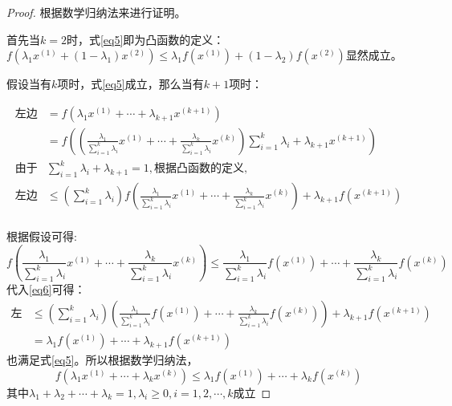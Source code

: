 \documentclass[a4paper]{article}
\begin{document}
\begin{proof}
	根据数学归纳法来进行证明。
	
	首先当$k=2$时，式\ref{eq5}即为凸函数的定义：$f(\lambda_1x^{(1)}+(1-\lambda_1)x^{(2)})\le \lambda_1f(x^{(1)})+(1-\lambda_2)f(x^{(2)})$显然成立。
	
	假设当有$k$项时，式\ref{eq5}成立，那么当有$k+1$项时：
	
	\begin{equation}
	\label{eq6}
	\begin{aligned}
	\mbox{左边} &= f(\lambda_1x^{(1)}+\cdots+\lambda_{k+1}x^{(k+1)}) \\
	&= f((\frac{\lambda_1}{\sum_{i=1}^k\lambda_i}x^{(1)}+\cdots+\frac{\lambda_k}{\sum_{i=1}^k\lambda_i}x^{(k)})\sum_{i=1}^k\lambda_i+\lambda_{k+1}x^{(k+1)}) \\
	\mbox{由于}&\sum_{i=1}^k\lambda_i+\lambda_{k+1}=1,\mbox{根据凸函数的定义},\\
	\mbox{左边}&\le(\sum_{i=1}^k\lambda_i)f(\frac{\lambda_1}{\sum_{i=1}^k\lambda_i}x^{(1)}+\cdots+\frac{\lambda_k}{\sum_{i=1}^k\lambda_i}x^{(k)})+\lambda_{k+1}f(x^{(k+1)}) \\
	\end{aligned}
	\end{equation}
	
	根据假设可得:
	\begin{equation}
	f(\frac{\lambda_1}{\sum_{i=1}^k\lambda_i}x^{(1)}+\cdots+\frac{\lambda_k}{\sum_{i=1}^k\lambda_i}x^{(k)}) \le \frac{\lambda_1}{\sum_{i=1}^k\lambda_i}f(x^{(1)})+\cdots+\frac{\lambda_k}{\sum_{i=1}^k\lambda_i}f(x^{(k)})
	\end{equation}
	代入\ref{eq6}可得：
	\begin{equation}
	\label{eq6}
	\begin{aligned}
	\mbox{左边}&\le(\sum_{i=1}^k\lambda_i)(\frac{\lambda_1}{\sum_{i=1}^k\lambda_i}f(x^{(1)})+\cdots+\frac{\lambda_k}{\sum_{i=1}^k\lambda_i}f(x^{(k)}))+\lambda_{k+1}f(x^{(k+1)}) \\
	&=\lambda_1f(x^{(1)})+\cdots+\lambda_{k+1}f(x^{(k+1)})
	\end{aligned}
	\end{equation}
	也满足式\ref{eq5}。所以根据数学归纳法，
	\begin{equation}
	\label{eq7}
	f(\lambda_1x^{(1)}+\cdots+\lambda_kx^{(k)})\le \lambda_1f(x^{(1)})+\cdots+\lambda_kf(x^{(k)})
	\end{equation}
	其中$\lambda_1+\lambda_2+\cdots+\lambda_k=1,\lambda_i\ge 0,i=1,2,\cdots,k$成立
	
\end{proof}
\end{document}
